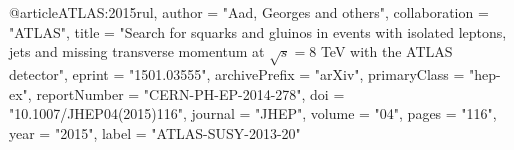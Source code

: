 @article{ATLAS:2015rul,
    author = "Aad, Georges and others",
    collaboration = "ATLAS",
    title = "{Search for squarks and gluinos in events with isolated leptons, jets and missing transverse momentum at $\sqrt{s}=8$ TeV with the ATLAS detector}",
    eprint = "1501.03555",
    archivePrefix = "arXiv",
    primaryClass = "hep-ex",
    reportNumber = "CERN-PH-EP-2014-278",
    doi = "10.1007/JHEP04(2015)116",
    journal = "JHEP",
    volume = "04",
    pages = "116",
    year = "2015",
    label = "ATLAS-SUSY-2013-20"
}

